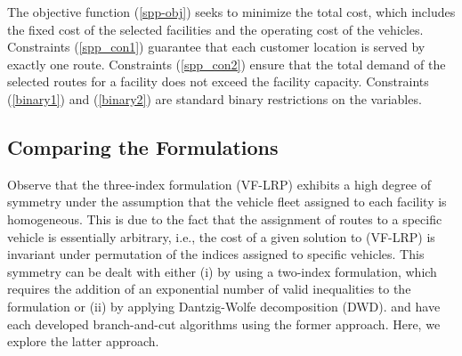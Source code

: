 \documentclass[graybox]{./styles/svmult}
\begin{document}
The objective function (\ref{spp-obj}) seeks to minimize the total
cost, which includes the fixed cost of the selected facilities and the
operating cost of the vehicles. Constraints (\ref{spp_con1}) guarantee
that each customer location is served by exactly one route.
Constraints (\ref{spp_con2}) ensure that the total demand of the
selected routes for a facility does not exceed the facility capacity.
Constraints (\ref{binary1}) and (\ref{binary2}) are standard
binary restrictions on the variables.

\subsection{Comparing the Formulations}
Observe that the three-index formulation (VF-LRP) exhibits a high
degree of symmetry under the assumption that the vehicle fleet
assigned to each facility is homogeneous. This is due to the fact that
the assignment of routes to a specific vehicle is essentially arbitrary,
i.e., the cost of a given solution to (VF-LRP) is invariant under
permutation of the indices assigned to specific vehicles. This
symmetry can be dealt with either (i) by using a two-index
formulation, which requires the addition of an exponential number of
valid inequalities to the formulation or (ii) by applying
Dantzig-Wolfe decomposition (DWD). \citet{Laporte86} and
\citet{Belenguer} have each developed branch-and-cut algorithms using
the former approach. Here, we explore the latter approach.
\end{document}
